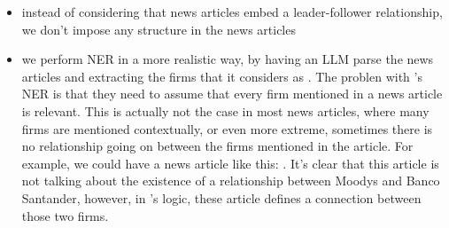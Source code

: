 

\begin{itemize}
  \item instead of considering that news articles embed a leader-follower relationship, we don't impose any structure in the news articles
  \item we perform NER in a more realistic way, by having an LLM parse the news articles and extracting the firms that it considers as . The problen with \cite{hu2021networks}'s NER is that they need to assume that every firm mentioned in a news article is relevant. This is actually not the case in most news articles, where many firms are mentioned contextually, or even more extreme, sometimes there is no relationship going on between the firms mentioned in the article. For example, we could have a news article like this: . It's clear that this article is not talking about the existence of a relationship between Moodys and Banco Santander, however, in \cite{hu2021networks}'s logic, these article defines a connection between those two firms.
\end{itemize}






